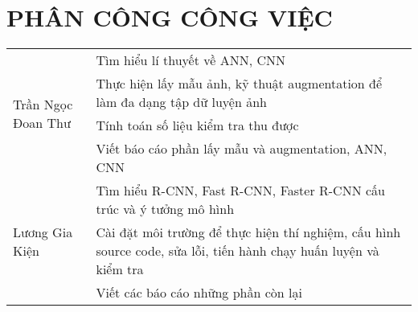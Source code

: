 \chapter*{PHÂN CÔNG CÔNG VIỆC}
\begin{table}[H]
    \begin{tabular}{| p{4cm} | p{11cm} |}
    \hline
    \multirow{4}{*}{Trần Ngọc Đoan Thư} & Tìm hiểu lí thuyết về ANN, CNN \\ 
    							
    								& Thực hiện lấy mẫu ảnh, kỹ thuật augmentation để làm đa dạng tập dữ luyện ảnh \\
  
    								& Tính toán số liệu kiểm tra thu được \\
    								& Viết báo cáo phần lấy mẫu và augmentation, ANN, CNN \\
    
			 		    \hline
   \multirow{3}{*}{Lương Gia Kiện} &  Tìm hiểu R-CNN, Fast R-CNN, Faster R-CNN cấu trúc và ý tưởng mô hình \\
	         						  
			 						 & Cài đặt môi trường để thực hiện thí nghiệm, cấu hình source code, sửa lỗi, tiến hành chạy huấn luyện và kiểm tra\\
			 						 & Viết các báo cáo những phần còn lại\\
			 
			     \hline
	\end{tabular}
\end{table}

